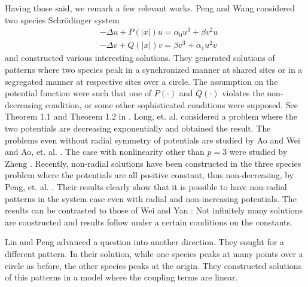 \documentclass[a4paper,11pt]{article}
\theoremstyle{remark}
\begin{document}
Having those said, we remark a few relevant works. Peng and Wang \cite{peng_wang_2013} considered two species Schr\"odinger system 
\begin{align*}
 &-\Delta u + P(|x|)u = \alpha_0 u^3 + \beta v^2 u\\
 &-\Delta v + Q(|x|)v = \beta v^3 + \alpha_1 u^2 v
\end{align*}
and constructed various interesting solutions. They generated solutions of patterns where two species peak in a synchronized manner at shared sites or in a segregated manner at respective sites over a circle. The assumption on the potential function were such that one of $P(\cdot)$ and $Q(\cdot)$ violates the non-decreasing condition, or some other sophisticated conditions were supposed. See Theorem 1.1 and Theorem 1.2 in \cite{peng_wang_2013}. Long, et. al. \cite{long_tang_yang_2020} considered a problem where the two potentials are decreasing exponentially and obtained the result. The problems even without radial symmetry of potentials are studied by Ao and Wei \cite{ao_wei_2014} and Ao, et. al. \cite{ao_wang_yao_2016}. The case with nonlinearity other than $p=3$ were studied by Zheng \cite{zheng_2017}. Recently, non-radial solutions have been constructed in the three species problem where the potentials are all positive constant, thus non-decreasing, by Peng, et. al. \cite{peng_wang_wang_2019}. Their results clearly show that it is possible to have non-radial patterns in the system case even with radial and non-increasing potentials. %
The results can be contrasted to those of Wei and Yan \cite{wei_yan_2014}: Not infinitely many solutions are constructed and results follow under a certain conditions on the constants.


Lin and Peng \cite{lin_peng_2014} advanced a question into another direction. They sought for a different pattern. In their solution, while one species peaks at many points over a circle as before, the other species peaks at the origin. They constructed solutions of this patterns in a model where the coupling terms are linear.
\end{document}
